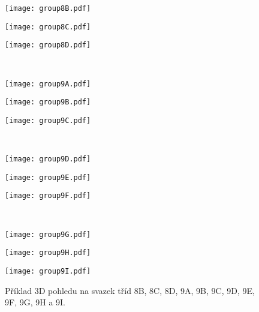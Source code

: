 \begin{figure}[htps]
\centering
\begin{minipage}[c]{0.325\textwidth}
\texttt{[image: group8B.pdf]}
\end{minipage}
\begin{minipage}[c]{0.325\textwidth}
\texttt{[image: group8C.pdf]}
\end{minipage}
\begin{minipage}[c]{0.325\textwidth}
\texttt{[image: group8D.pdf]}
\end{minipage}\\

\begin{minipage}[c]{0.325\textwidth}
\texttt{[image: group9A.pdf]}
\end{minipage}
\begin{minipage}[c]{0.325\textwidth}
\texttt{[image: group9B.pdf]}
\end{minipage}
\begin{minipage}[c]{0.325\textwidth}
\texttt{[image: group9C.pdf]}
\end{minipage}\\

\begin{minipage}[c]{0.325\textwidth}
\texttt{[image: group9D.pdf]}
\end{minipage}
\begin{minipage}[c]{0.325\textwidth}
\texttt{[image: group9E.pdf]}
\end{minipage}
\begin{minipage}[c]{0.325\textwidth}
\texttt{[image: group9F.pdf]}
\end{minipage}\\

\begin{minipage}[c]{0.325\textwidth}
\texttt{[image: group9G.pdf]}
\end{minipage}
\begin{minipage}[c]{0.325\textwidth}
\texttt{[image: group9H.pdf]}
\end{minipage}
\begin{minipage}[c]{0.325\textwidth}
\texttt{[image: group9I.pdf]}
\end{minipage}

\caption[Svazky třídy 8B-9I.]{Příklad 3D pohledu na svazek tříd 8B, 8C, 8D, 9A, 9B, 9C, 9D, 9E, 9F, 9G, 9H a 9I.}
\label{fig:modelClass3D4}
\end{figure}

\clearpage